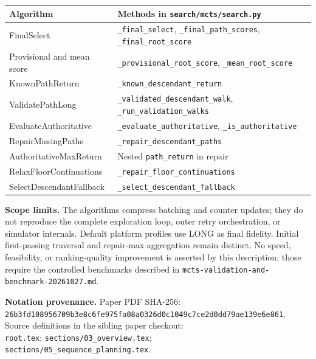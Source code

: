 \documentclass[11pt]{article}
\begin{document}
\begin{tabular}{p{.40\linewidth}p{.54\linewidth}}
\hline
Algorithm & Methods in \texttt{search/mcts/search.py} \\
\hline
FinalSelect & \texttt{\_final\_select}, \texttt{\_final\_path\_scores},
\texttt{\_final\_root\_score}\\
Provisional and mean score & \texttt{\_provisional\_root\_score},
\texttt{\_mean\_root\_score}\\
KnownPathReturn & \texttt{\_known\_descendant\_return}\\
ValidatePathLong & \texttt{\_validated\_descendant\_walk},
\texttt{\_run\_validation\_walks}\\
EvaluateAuthoritative & \texttt{\_evaluate\_authoritative},
\texttt{\_is\_authoritative}\\
RepairMissingPaths & \texttt{\_repair\_descendant\_paths}\\
AuthoritativeMaxReturn & Nested \texttt{path\_return} in repair\\
RelaxFloorContinuations & \texttt{\_repair\_floor\_continuations}\\
SelectDescendantFallback & \texttt{\_select\_descendant\_fallback}\\
\hline
\end{tabular}

\textbf{Scope limits.} The algorithms compress batching and counter updates;
they do not reproduce the complete exploration loop, outer retry orchestration,
or simulator internals. Default platform profiles use LONG as final fidelity.
Initial first-passing traversal and repair-max aggregation remain distinct.
No speed, feasibility, or ranking-quality improvement is asserted by this
description; those require the controlled benchmarks described in
\texttt{mcts-validation-and-benchmark-20261027.md}.

\textbf{Notation provenance.} Paper PDF SHA-256:\\
\texttt{26b3fd108956709b3e8c6fe975fa08a0326d0c1049c7ce2d0dd79ae139e6e861}.\\
Source definitions in the sibling paper checkout:\\
\texttt{root.tex}; \texttt{sections/03\_overview.tex};\\
\texttt{sections/05\_sequence\_planning.tex}.
\end{document}
